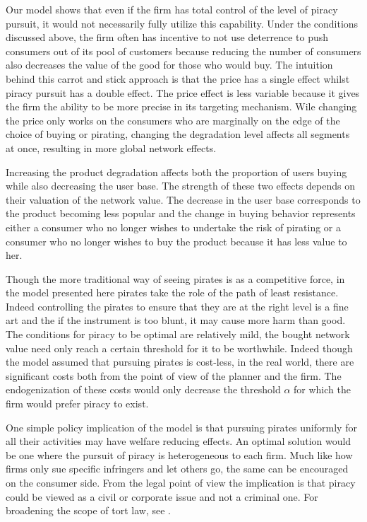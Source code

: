 \documentclass[12pt]{article}
\numberwithin{equation}{section}
\begin{document}
Our model shows that even if the firm has total control of the level of piracy pursuit, it would not necessarily fully utilize this capability. Under the conditions discussed above, the firm often has incentive to not use deterrence to push consumers out of its pool of customers because reducing the number of consumers also decreases the value of the good for those who would buy. The intuition behind this carrot and stick approach is that the price has a single effect whilst piracy pursuit has a double effect. The price effect is less variable because it gives the firm the ability to be more precise in its targeting mechanism. Wile changing the price only works on the consumers who are marginally on the edge of the choice of buying or pirating, changing the degradation level affects all segments at once, resulting in more global network effects. 

Increasing the product degradation affects both the proportion of users buying while also decreasing the user base. The strength of these two effects depends on their valuation of the network value. The decrease in the user base corresponds to the product becoming less popular and the change in buying behavior represents either a consumer who no longer wishes to undertake the risk of pirating or a consumer who no longer wishes to buy the product because it has less value to her.

Though the more traditional way of seeing pirates is as a competitive force, in the model presented here pirates take the role of the path of least resistance. Indeed controlling the pirates to ensure that they are at the right level is a fine art and the if the instrument is too blunt, it may cause more harm than good. The conditions for piracy to be optimal are relatively mild, the bought network value need only reach a certain threshold for it to be worthwhile. Indeed though the model assumed that pursuing pirates is cost-less, in the real world, there are significant costs both from the point of view of the planner and the firm. The endogenization of these costs would only decrease the threshold $\alpha$ for which the firm would prefer piracy to exist.

One simple policy implication of the model is that pursuing pirates uniformly for all their activities may have welfare reducing effects. An optimal solution would be one where the pursuit of piracy is  heterogeneous to each firm. Much like how firms only sue specific infringers and let others go, the same can be encouraged on the consumer side. From the legal point of view the implication is that piracy could be viewed as a civil or corporate issue and not a criminal one. For broadening the scope of tort law, see \citep{DF96}. 
\end{document}
